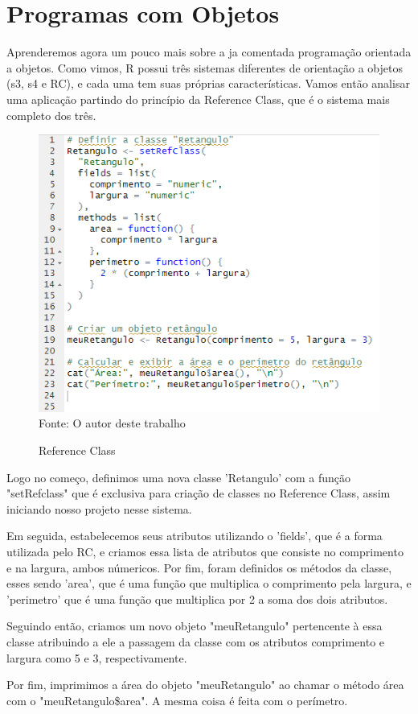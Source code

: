     \section{Programas com Objetos}
    Aprenderemos agora um pouco mais sobre a ja comentada programação orientada a objetos. Como vimos, R possui três sistemas diferentes de orientação a objetos (s3, s4 e RC), e cada uma tem suas próprias características. Vamos então analisar uma aplicação partindo do princípio da Reference Class, que é o sistema mais completo dos três.
    \begin{figure}[H]
    	\centering
    	\caption{Reference Class}
    	\includegraphics[width=1.0\linewidth]{Prints/screenshot022}
    	\label{fig:screenshot022}
    	{\tiny \sf Fonte: O autor deste trabalho }
    \end{figure}
    Logo no começo, definimos uma nova classe 'Retangulo' com a função "setRefclass" que é exclusiva para criação de classes no Reference Class, assim iniciando nosso projeto nesse sistema.\par Em seguida, estabelecemos seus atributos utilizando o 'fields', que é a forma utilizada pelo RC, e criamos essa lista de atributos que consiste no comprimento e na largura, ambos númericos. Por fim, foram definidos os métodos da classe, esses sendo 'area', que é uma função que multiplica o comprimento pela largura, e 'perimetro' que é uma função que multiplica por 2 a soma dos dois atributos.\par Seguindo então,  criamos um novo objeto "meuRetangulo" pertencente à essa classe atribuindo a ele a passagem da classe com os atributos comprimento e largura como 5 e 3, respectivamente.\par Por fim, imprimimos a área do objeto "meuRetangulo" ao chamar o método área com o "meuRetangulo\$area". A mesma coisa é feita com o perímetro.
    

